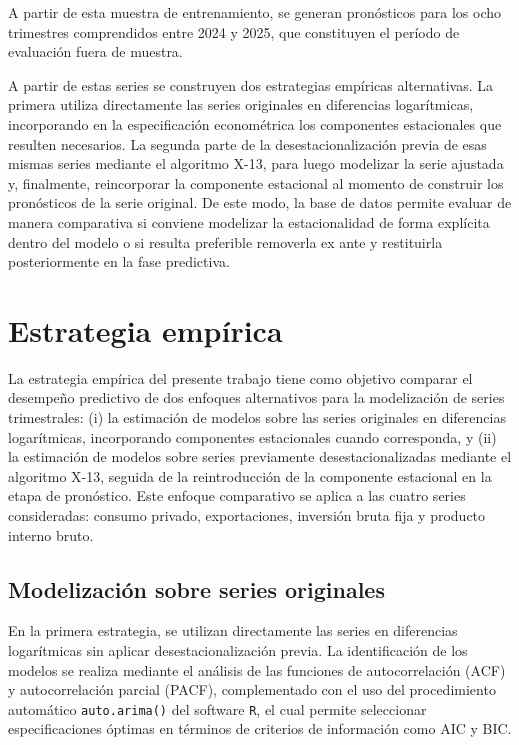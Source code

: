 \documentclass[12pt,a4paper]{article}
\begin{document}
	A partir de esta muestra de entrenamiento, se generan pronósticos para los ocho trimestres comprendidos entre 2024 y 2025, que constituyen el período de evaluación fuera de muestra. 
	
	A partir de estas series se construyen dos estrategias empíricas alternativas. La primera utiliza directamente las series originales en diferencias logarítmicas, incorporando en la especificación econométrica los componentes estacionales que resulten necesarios. La segunda parte de la desestacionalización previa de esas mismas series mediante el algoritmo X-13, para luego modelizar la serie ajustada y, finalmente, reincorporar la componente estacional al momento de construir los pronósticos de la serie original. De este modo, la base de datos permite evaluar de manera comparativa si conviene modelizar la estacionalidad de forma explícita dentro del modelo o si resulta preferible removerla ex ante y restituirla posteriormente en la fase predictiva. 
	\section{Estrategia empírica}
	
	La estrategia empírica del presente trabajo tiene como objetivo comparar el desempeño predictivo de dos enfoques alternativos para la modelización de series trimestrales: (i) la estimación de modelos sobre las series originales en diferencias logarítmicas, incorporando componentes estacionales cuando corresponda, y (ii) la estimación de modelos sobre series previamente desestacionalizadas mediante el algoritmo X-13, seguida de la reintroducción de la componente estacional en la etapa de pronóstico. Este enfoque comparativo se aplica a las cuatro series consideradas: consumo privado, exportaciones, inversión bruta fija y producto interno bruto. 
	
	\subsection{Modelización sobre series originales}
	
	En la primera estrategia, se utilizan directamente las series en diferencias logarítmicas sin aplicar desestacionalización previa. La identificación de los modelos se realiza mediante el análisis de las funciones de autocorrelación (ACF) y autocorrelación parcial (PACF), complementado con el uso del procedimiento automático \texttt{auto.arima()} del software \texttt{R}, el cual permite seleccionar especificaciones óptimas en términos de criterios de información como AIC y BIC.
	
\end{document}

